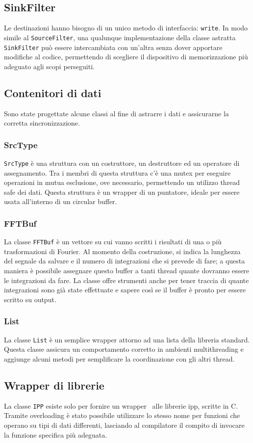\subsection{SinkFilter}
Le destinazioni hanno bisogno di un unico metodo di interfaccia: \texttt{write}.
In modo simile al \texttt{SourceFilter}, una qualunque implementazione della
classe astratta \texttt{SinkFilter} pu\`o essere intercambiata con un'altra
senza dover apportare modifiche al codice, permettendo di scegliere il
dispositivo di memorizzazione pi\`u adeguato agli scopi perseguiti.
\subsection{Contenitori di dati}
Sono state progettate alcune classi al fine di astrarre i dati e assicurarne la
corretta sincronizzazione.
\subsubsection{SrcType}
\texttt{SrcType} \`e una struttura con un costruttore, un destruttore ed un
operatore di assegnamento. Tra i membri di questa struttura c'\`e una mutex per
eseguire operazioni in mutua esclusione, ove necessario, permettendo un utilizzo
thread safe dei dati. Questa struttura \`e un wrapper di un puntatore, ideale
per essere usata all'interno di un circular buffer.
\subsubsection{FFTBuf} La classe \texttt{FFTBuf} \`e un vettore su cui
vanno scritti i risultati di una o pi\`u trasformazioni di Fourier. Al momento
della costruzione, si indica la lunghezza del segnale da salvare e il numero di
integrazioni che si prevede di fare; a questa maniera \`e possibile assegnare
questo buffer a tanti thread quante dovranno essere le integrazioni da fare. La
classe offre strumenti anche per tener traccia di quante integrazioni sono gi\`a
state effettuate e sapere cos\`i se il buffer \`e pronto per essere scritto su
output.
\subsubsection{List}
La classe \texttt{List} \`e un semplice wrapper attorno ad una lista della
libreria standard. Questa classe assicura un comportamento corretto in ambienti
multithreading e aggiunge alcuni metodi per semplificare la coordinazione con
gli altri thread.

\subsection{Wrapper di librerie}
La classe \texttt{IPP} esiste solo per fornire un wrapper \CC\, alle librerie
\ac{ipp}, scritte in C. Tramite overloading \`e stato possibile utilizzare lo
stesso nome per funzioni che operano su tipi di dati differenti, lasciando al
compilatore il compito di invocare la funzione specifica pi\`u adeguata.

